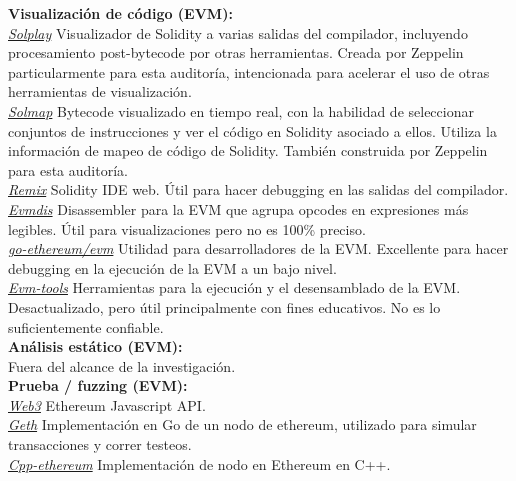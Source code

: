 \textbf{Visualización de código (EVM):}\\

\underline{\textit{Solplay}}\cite{SolplayLink}
Visualizador de Solidity a varias salidas del compilador, incluyendo procesamiento post-bytecode por otras herramientas. Creada por Zeppelin particularmente para esta auditoría, intencionada para acelerar el uso de otras herramientas de visualización.\\

\underline{\textit{Solmap}}\cite{SolmapLink}
Bytecode visualizado en tiempo real, con la habilidad de seleccionar conjuntos de instrucciones y ver el código en Solidity asociado a ellos. Utiliza la información de mapeo de código de Solidity. También construida por Zeppelin para esta auditoría.\\

\underline{\textit{Remix}}\cite{RemixLink}
Solidity IDE web. Útil para hacer debugging en las salidas del compilador. \\

\underline{\textit{Evmdis}}\cite{EvmdisLink}
Disassembler para la EVM que agrupa opcodes en expresiones más legibles. Útil para visualizaciones pero no es 100\% preciso.\\

\underline{\textit{go-ethereum/evm}}\cite{goEthereumLink}
Utilidad para desarrolladores de la EVM. Excellente para hacer debugging en la ejecución de la EVM a un bajo nivel.\\

\underline{\textit{Evm-tools}}\cite{evmToolsLink}
Herramientas para la ejecución y el desensamblado de la EVM. Desactualizado, pero útil principalmente con fines educativos. No es lo suficientemente confiable.\\

\textbf{Análisis estático (EVM):}\\
Fuera del alcance de la investigación.\\

\textbf{Prueba / fuzzing (EVM):}\\

\underline{\textit{Web3}}\cite{Web3Link}
Ethereum Javascript API.\\

\underline{\textit{Geth}}\cite{GethLink}
Implementación en Go de un nodo de ethereum, utilizado para simular transacciones y correr testeos.\\

\underline{\textit{Cpp-ethereum}}\cite{cppEthereumLink}
Implementación de nodo en Ethereum en C++.\\

